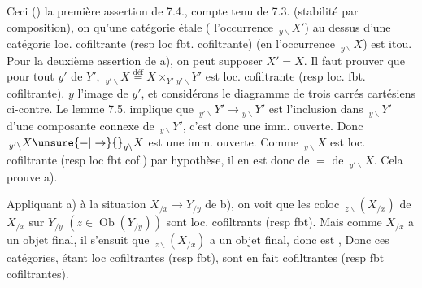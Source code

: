 Ceci   () la première
assertion de 7.4., compte tenu de 7.3.
(stabilité par composition), on  qu'une
catégorie étale ( l'occurrence $\,{}_{y\backslash}X'$)
au dessus d'une catégorie
loc. cofiltrante (resp loc fbt. cofiltrante) (en l'occurrence $\,{}_{y\backslash}X$) est
itou. Pour la deuxième assertion de a), on
peut  supposer $X'=X$. Il faut prouver
que pour tout $y'$ de $Y'$,
$\,{}_{y'\backslash}X\mathrel{\overset{\mathrm{déf}}{=}}X\times_{Y'}{}_{y'\backslash}Y'$ est loc. cofiltrante
(resp loc. fbt. cofiltrante). 
$y$ l'image de $y'$, et considérons
le diagramme de trois carrés
cartésiens ci-contre. Le lemme 7.5.
implique que $\,{}_{y'\backslash}Y'\longrightarrow{}_{y\backslash}Y'$ est l'inclusion
dans $\,{}_{y\backslash}Y'$ d'une composante connexe de $\,{}_{y\backslash}Y'$,
c'est donc une imm. ouverte. Donc
$\,{}_{y'\backslash}X\unsure{-|\to}{}_{y\backslash}X$ est une imm. ouverte. Comme
$\,{}_{y\backslash}X$ est loc. cofiltrante (resp loc fbt cof.) par
hypothèse, il en est donc de $=$ de
$\,{}_{y'\backslash}X$. Cela prouve a).

Appliquant a) à la situation $X_{/x}\longrightarrow Y_{/y}$
de b), on voit que les coloc
$\,{}_{z\backslash}(X_{/x})$ de $X_{/x}$ sur $Y_{/y}$ $(z\in\operatorname{Ob}(Y_{/y}))$
sont loc. cofiltrants (resp fbt). Mais
comme $X_{/x}$ a un objet final, il s'ensuit
que $\,{}_{z\backslash}(X_{/x})$ a un objet final, donc est \uline{},
\margin{! $\vert\!\vert\!\vert$}
Donc ces catégories, étant loc cofiltrantes (resp fbt),
sont en fait cofiltrantes (resp fbt cofiltrantes).


